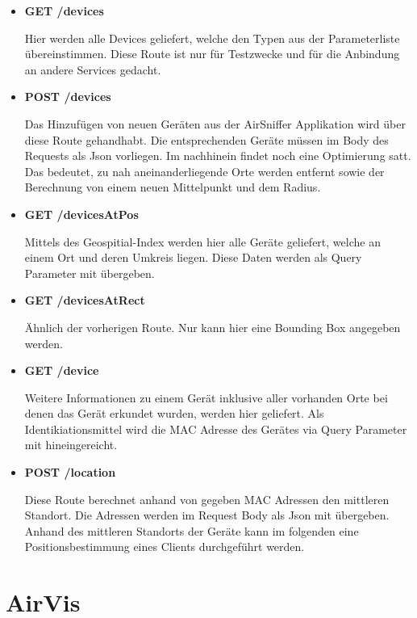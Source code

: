 \documentclass[11pt,a4paper]{article}
\begin{document}
\begin{itemize}
\item{} \textbf{GET /devices}

Hier werden alle Devices geliefert, welche den Typen aus der Parameterliste übereinstimmen. Diese Route ist nur für Testzwecke und für die Anbindung an andere Services gedacht. 

\item{} \textbf{POST /devices}

Das Hinzufügen von neuen Geräten aus der AirSniffer Applikation wird über diese Route gehandhabt. Die entsprechenden Geräte müssen im Body des Requests als Json vorliegen. Im nachhinein findet noch eine Optimierung satt. Das bedeutet, zu nah aneinanderliegende Orte werden entfernt sowie der Berechnung von einem neuen Mittelpunkt und dem Radius.

\item{} \textbf{GET /devicesAtPos}

Mittels des Geospitial-Index werden hier alle Geräte geliefert, welche an einem Ort und deren Umkreis liegen. Diese Daten werden als Query Parameter mit übergeben.

\item{} \textbf{GET /devicesAtRect}

Ähnlich der vorherigen Route. Nur kann hier eine Bounding Box angegeben werden.

\item{} \textbf{GET /device}

Weitere Informationen zu einem Gerät inklusive aller vorhanden Orte bei denen das Gerät erkundet wurden, werden hier geliefert. Als Identikiationsmittel wird die MAC Adresse des Gerätes via Query Parameter mit hineingereicht.

\item{} \textbf{POST /location}

Diese Route berechnet anhand von gegeben MAC Adressen den mittleren Standort. Die Adressen werden im Request Body als Json mit übergeben. Anhand des mittleren Standorts der Geräte kann im folgenden eine Positionsbestimmung eines Clients durchgeführt werden.

\end{itemize}


\section{AirVis}
\end{document}
